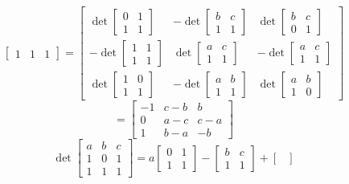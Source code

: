 \begin{itemize}
$$\begin{bmatrix}
1 & 1 & 1
\end{bmatrix} = \begin{bmatrix}
\det\begin{bmatrix}
0 & 1 \\
1 & 1
\end{bmatrix} & -\det\begin{bmatrix}
b & c \\
1 & 1
\end{bmatrix} & \det\begin{bmatrix}
b & c \\
0 & 1
\end{bmatrix} \\
-\det\begin{bmatrix}
1 & 1 \\
1 & 1
\end{bmatrix} & \det\begin{bmatrix}
a & c \\
1 & 1
\end{bmatrix} & -\det\begin{bmatrix}
a & c \\
1 & 1
\end{bmatrix} \\
\det\begin{bmatrix}
1 & 0 \\
1 & 1
\end{bmatrix} & -\det\begin{bmatrix}
a & b \\
1 & 1
\end{bmatrix} & \det\begin{bmatrix}
a & b \\
1 & 0
\end{bmatrix}
\end{bmatrix}$$
$$= \begin{bmatrix}
-1 & c - b & b \\
0 & a - c & c - a \\
1 & b - a & -b
\end{bmatrix}$$
$$\det\begin{bmatrix}
a & b & c \\
1 & 0 & 1 \\
1 & 1 & 1
\end{bmatrix} = a\begin{bmatrix}
0 & 1 \\
1 & 1
\end{bmatrix} - \begin{bmatrix}
b & c \\
1 & 1
\end{bmatrix} + \begin{bmatrix}

\end{bmatrix}$$
\end{itemize}
